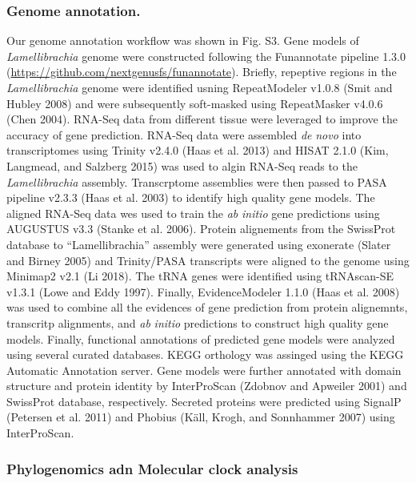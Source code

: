 \documentclass[]{article}
\begin{document}
\hypertarget{genome-annotation.}{%
\subsubsection{Genome annotation.}\label{genome-annotation.}}

Our genome annotation workflow was shown in Fig. S3. Gene models of
\emph{Lamellibrachia} genome were constructed following the Funannotate
pipeline 1.3.0 (\url{https://github.com/nextgenusfs/funannotate}).
Briefly, repeptive regions in the \emph{Lamellibrachia} genome were
identified usning RepeatModeler v1.0.8 (Smit and Hubley 2008) and were
subsequently soft-masked using RepeatMasker v4.0.6 (Chen 2004). RNA-Seq
data from different tissue were leveraged to improve the accuracy of
gene prediction. RNA-Seq data were assembled \emph{de} \emph{novo} into
transcriptomes using Trinity v2.4.0 (Haas et al. 2013) and HISAT 2.1.0
(Kim, Langmead, and Salzberg 2015) was used to algin RNA-Seq reads to
the \emph{Lamellibrachia} assembly. Transcrptome assemblies were then
passed to PASA pipeline v2.3.3 (Haas et al. 2003) to identify high
quality gene models. The aligned RNA-Seq data wes used to train the
\emph{ab} \emph{initio} gene predictions using AUGUSTUS v3.3 (Stanke et
al. 2006). Protein alignements from the SwissProt database to
``Lamellibrachia'' assembly were generated using exonerate (Slater and
Birney 2005) and Trinity/PASA transcripts were aligned to the genome
using Minimap2 v2.1 (Li 2018). The tRNA genes were identified using
tRNAscan-SE v1.3.1 (Lowe and Eddy 1997). Finally, EvidenceModeler 1.1.0
(Haas et al. 2008) was used to combine all the evidences of gene
prediction from protein alignemnts, transcritp alignments, and \emph{ab}
\emph{initio} predictions to construct high quality gene models.
Finally, functional annotations of predicted gene models were analyzed
using several curated databases. KEGG orthology was assinged using the
KEGG Automatic Annotation server. Gene models were further annotated
with domain structure and protein identity by InterProScan (Zdobnov and
Apweiler 2001) and SwissProt database, respectively. Secreted proteins
were predicted using SignalP (Petersen et al. 2011) and Phobius (Käll,
Krogh, and Sonnhammer 2007) using InterProScan.

\hypertarget{phylogenomics-adn-molecular-clock-analysis}{%
\subsubsection{Phylogenomics adn Molecular clock
analysis}\label{phylogenomics-adn-molecular-clock-analysis}}
\end{document}
